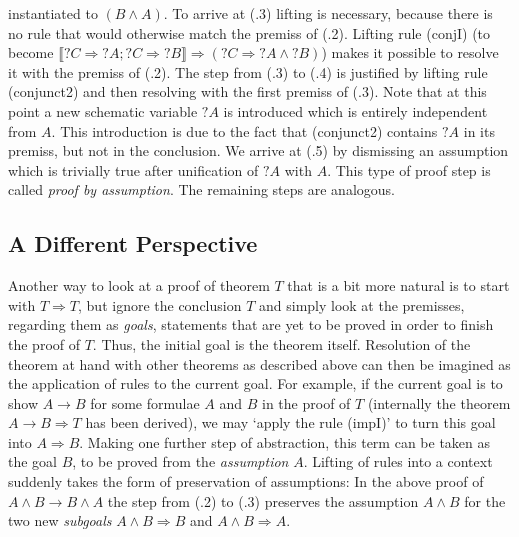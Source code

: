 \begin{expl}
  instantiated to $(B\land A)$. To arrive at (.3) lifting is necessary, because there
  is no rule that would otherwise match the premiss of (.2). Lifting rule
  (conjI) (to become $\llbracket?C \Longrightarrow {}?A; ?C \Longrightarrow {}?B\rrbracket \Longrightarrow (?C \Longrightarrow {}?A \land{} ?B)$) makes it
  possible to resolve it with the premiss of (.2). The step from (.3) to (.4) is
  justified by lifting rule (conjunct2) and then resolving with the first
  premiss of (.3). Note that at this point a new schematic variable $?A$ is
  introduced which is entirely independent from $A$. This introduction is due to
  the fact that (conjunct2) contains $?A$ in its premiss, but not in the
  conclusion. We arrive at (.5) by dismissing an assumption which is trivially
  true after unification of $?A$ with $A$. This type of proof step is called
  \emph{proof by assumption}. The remaining steps are analogous.
\end{expl}



\subsection{A Different Perspective}
\label{sec:diff-persp}


Another way to look at a proof of theorem $T$ that is a bit more natural is to
start with $T \Longrightarrow T$, but ignore the conclusion $T$ and simply look at the
premisses, regarding them as \emph{goals}, \IE statements that are yet to be
proved in order to finish the proof of $T$. Thus, the initial goal is the
theorem itself. Resolution of the theorem at hand with other theorems as
described above can then be imagined as the application of rules to the current
goal. For example, if the current goal is to show $A \longrightarrow B$ for some formulae $A$
and $B$ in the proof of $T$ (\IE internally the theorem $A \longrightarrow B \Longrightarrow T$ has been
derived), we may `apply the rule (impI)' to turn this goal into $A \Longrightarrow B$. Making
one further step of abstraction, this term can be taken as the goal $B$, to be
proved from the \emph{assumption} $A$. Lifting of rules into a context suddenly
takes the form of preservation of assumptions: In the above proof of $A\land B\longrightarrow B\land A$
the step from (.2) to (.3) preserves the assumption $A\land B$ for the two new
\emph{subgoals} $A\land B\Longrightarrow B$ and $A\land B \Longrightarrow A$.

